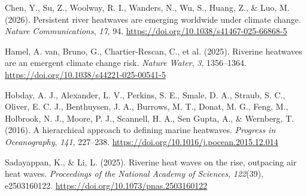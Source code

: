 \documentclass[
]{article}
\newlength{\cslhangindent}
\newenvironment{CSLReferences}[2] %
 {\begin{list}{}{%
  \setlength{\itemindent}{0pt}
  \setlength{\leftmargin}{0pt}
  \setlength{\parsep}{0pt}
  \ifodd #1
   \setlength{\leftmargin}{\cslhangindent}
   \setlength{\itemindent}{-1\cslhangindent}
  \fi
  \setlength{\itemsep}{#2\baselineskip}}}
 {\end{list}}
\begin{document}
\label{refs}
\begin{CSLReferences}{1}{0}
Chen, Y., Su, Z., Woolway, R. I., Wanders, N., Wu, S., Huang, Z., \&
Luo, M. (2026). Persistent river heatwaves are emerging worldwide under
climate change. \emph{Nature Communications}, \emph{17}, 94.
\url{https://doi.org/10.1038/s41467-025-66868-5}

Hamel, A. van, Bruno, G., Chartier-Rescan, C., et al. (2025). Riverine
heatwaves are an emergent climate change risk. \emph{Nature Water},
\emph{3}, 1356--1364. \url{https://doi.org/10.1038/s44221-025-00541-5}

Hobday, A. J., Alexander, L. V., Perkins, S. E., Smale, D. A., Straub,
S. C., Oliver, E. C. J., Benthuysen, J. A., Burrows, M. T., Donat, M.
G., Feng, M., Holbrook, N. J., Moore, P. J., Scannell, H. A., Sen Gupta,
A., \& Wernberg, T. (2016). A hierarchical approach to defining marine
heatwaves. \emph{Progress in Oceanography}, \emph{141}, 227--238.
\url{https://doi.org/10.1016/j.pocean.2015.12.014}

Sadayappan, K., \& Li, L. (2025). Riverine heat waves on the rise,
outpacing air heat waves. \emph{Proceedings of the National Academy of
Sciences}, \emph{122}(39), e2503160122.
\url{https://doi.org/10.1073/pnas.2503160122}

\end{CSLReferences}
\end{document}
